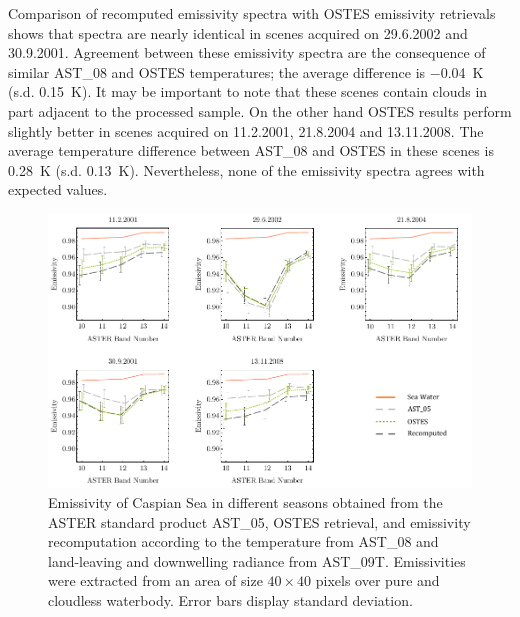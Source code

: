 Comparison of recomputed emissivity spectra with OSTES emissivity retrievals shows that spectra are nearly identical in scenes acquired on 29.6.2002 and 30.9.2001. Agreement between these emissivity spectra are the consequence of similar AST\_08 and OSTES temperatures; the average difference is \SI{-0.04}{\kelvin} (s.d. \SI{0.15}{\kelvin}). It may be important to note that these scenes contain clouds in part adjacent to the processed sample. On the other hand OSTES results perform slightly better in scenes acquired on 11.2.2001, 21.8.2004 and 13.11.2008. The average temperature difference between AST\_08 and OSTES in these scenes is \SI{0.28}{\kelvin} (s.d. \SI{0.13}{\kelvin}). Nevertheless, none of the emissivity spectra agrees with expected values.

\begin{figure}[!t]
\centering
\includegraphics[width=0.98\linewidth]{pics/Chapter_04/Caspian.pdf}
\vspace{1.5 em}
\caption{Emissivity of Caspian Sea in different seasons obtained from the ASTER standard product AST\_05, OSTES retrieval, and emissivity recomputation according to the temperature from AST\_08 and land-leaving and downwelling radiance from AST\_09T. Emissivities were extracted from an area of size $40 \times 40$ pixels over pure and cloudless waterbody. Error bars display standard deviation.}
\label{fig:CaspianSeaEmissivity}
\end{figure}

